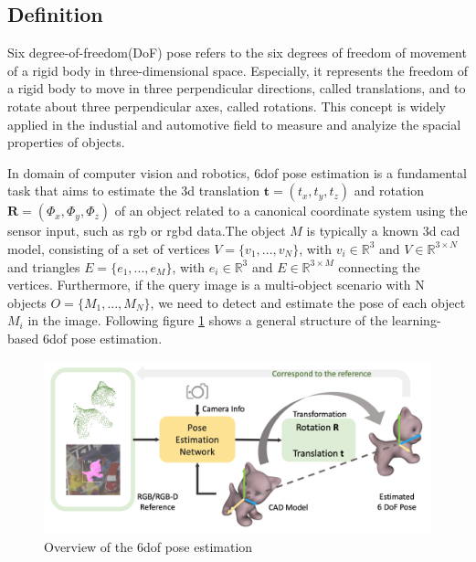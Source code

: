 \documentclass[12pt,DIV14,BCOR12mm,a4paper,footinclude=false,headinclude,parskip=half-,twoside,openright,cleardoublepage=empty,toc=index,bibliography=totoc,listof=totoc]{scrreprt}
\numberwithin{equation}{chapter}
\begin{document}
\subsection{Definition}
Six degree-of-freedom(DoF) pose refers to the six degrees of freedom of movement of a rigid body in three-dimensional space. Especially, it represents the freedom of a rigid body to move in three perpendicular directions, called translations, and to rotate about three perpendicular axes, called rotations. This concept is widely applied in the industial and automotive field to measure and analyize the spacial properties of objects.

In domain of computer vision and robotics, \gls{6dof} pose estimation is a fundamental task that aims to estimate the \gls{3d} translation $\mathbf{t}=(t_{x} ,t_{y} ,t_{z} )$ and rotation $\mathbf{R}=(\Phi_{x} ,\Phi_{y} ,\Phi_{z} )$ of an object related to a canonical coordinate system using the sensor input, such as \gls{rgb} or \gls{rgbd} data\cite{peng_pvnet_2019}.The object $M$ is typically a known \gls{3d} \gls{cad} model, consisting of a set of vertices $V=\{v_1,...,v_N\}$, with $v_i\in \mathbb{R}^3$ and $V\in \mathbb{R}^{3 \times N}$ and triangles $E=\{e_1,...,e_M\}$, with $e_i\in \mathbb{R}^3$ and $E\in \mathbb{R}^{3\times M}$ connecting the vertices. Furthermore, if the query image is a multi-object scenario with N objects $O=\{M_1,...,M_N\}$, we need to detect and estimate the pose of each object $M_i$ in the image\cite{Fabian_2021}.
Following figure \ref{img:6d} shows a general structure of the learning-based \gls{6dof} pose estimation.

\begin{figure}[h]
	\centering
	\includegraphics[scale=.2]{img/6d.png}
	\caption{Overview of the \gls{6dof} pose estimation}
	\label{img:6d}
\end{figure}
\end{document}
